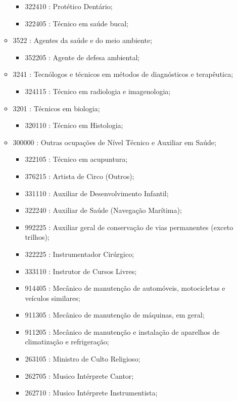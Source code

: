 \begin{itemize}
\begin{itemize}
\begin{itemize}
      \item 322410 : Protético Dentário;
      \item 322405 : Técnico em saúde bucal;
    \end{itemize}
    \item 3522 : Agentes da saúde e do meio ambiente;
    \begin{itemize}
      \item 352205 : Agente de defesa ambiental;
    \end{itemize}
    \item 3241 : Tecnólogos e técnicos em métodos de diagnósticos e terapêutica;
    \begin{itemize}
      \item 324115 : Técnico em radiologia e imagenologia;
    \end{itemize}
    \item 3201 : Técnicos em biologia;
    \begin{itemize}
      \item 320110 : Técnico em Histologia;
    \end{itemize}
    \item 300000 : Outras ocupações de Nível Técnico e Auxiliar em Saúde;
    \begin{itemize}
      \item 322105 : Técnico em acupuntura;
      \item 376215 : Artista de Circo (Outros);
      \item 331110 : Auxiliar de Desenvolvimento Infantil;
      \item 322240 : Auxiliar de Saúde (Navegação Marítima);
      \item 992225 : Auxiliar geral de conservação de vias permanentes (exceto trilhos);
      \item 322225 : Instrumentador Cirúrgico;
      \item 333110 : Instrutor de Cursos Livres;
      \item 914405 : Mecânico de manutenção de automóveis, motocicletas e veículos similares;
      \item 911305 : Mecânico de manutenção de máquinas, em geral;
      \item 911205 : Mecânico de manutenção e instalação de aparelhos de climatização e refrigeração;
      \item 263105 : Ministro de Culto Religioso;
      \item 262705 : Musico Intérprete Cantor;
      \item 262710 : Musico Intérprete Instrumentista;

\end{itemize}
\end{itemize}
\end{itemize}
